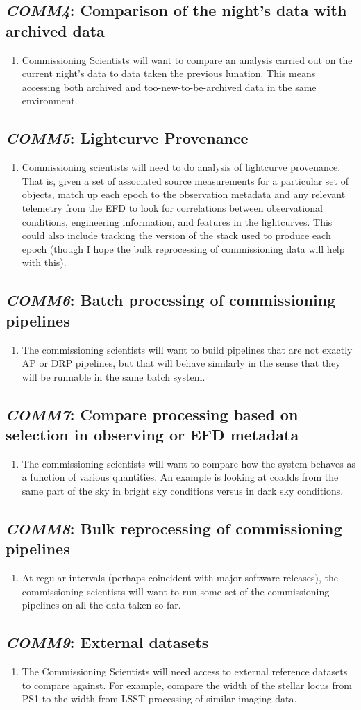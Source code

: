 \documentclass[DM,toc,lsstdraft]{lsstdoc}
\newcommand{\usecase}[3]{%
\subsection{\emph{#1}: #2}
\label{use:#1}
\begin{enumerate}[label=\alph*.]
#3
\end{enumerate}
}
\begin{document}
\usecase{COMM4}{Comparison of the night's data with archived data}{%

\item
Commissioning Scientists will want to compare an analysis carried out on the current night's data to data taken the previous lunation.
This means accessing both archived and too-new-to-be-archived data in the same environment.

}

\usecase{COMM5}{Lightcurve Provenance}{%

\item
Commissioning scientists will need to do analysis of lightcurve provenance.
That is, given a set of associated source measurements for a particular set of objects, match up each epoch to the observation metadata and any relevant telemetry from the EFD to look for correlations between observational conditions, engineering information, and features in the lightcurves.
This could also include tracking the version of the stack used to produce each epoch (though I hope the bulk reprocessing of commissioning data will help with this).

}

\usecase{COMM6}{Batch processing of commissioning pipelines}{%

\item
The commissioning scientists will want to build pipelines that are not exactly AP or DRP pipelines, but that will behave similarly in the sense that they will be runnable in the same batch system.

}

\usecase{COMM7}{Compare processing based on selection in observing or EFD metadata}{%

\item
The commissioning scientists will want to compare how the system behaves as a function of various quantities.
An example is looking at coadds from the same part of the sky in bright sky conditions versus in dark sky conditions.

}

\usecase{COMM8}{Bulk reprocessing of commissioning pipelines}{%

\item
At regular intervals (perhaps coincident with major software releases), the commissioning scientists will want to run some set of the commissioning pipelines on all the data taken so far.

}

\usecase{COMM9}{External datasets}{%

\item
The Commissioning Scientists will need access to external reference datasets to compare against.
For example, compare the width of the stellar locus from PS1 to the width from LSST processing of similar imaging data.

}
\end{document}
